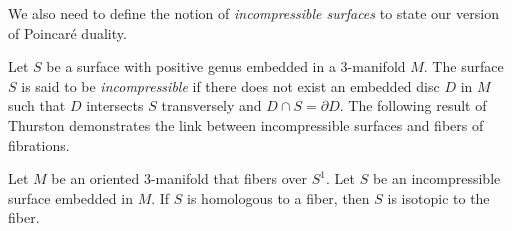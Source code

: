 


We also need to define the notion of \emph{incompressible surfaces} to state our version of Poincar\'e duality.

  Let $S$ be a surface with positive genus embedded in a $3$-manifold $M$.
  The surface $S$ is said to be \emph{incompressible} if there does not exist an embedded disc $D$ in $M$ such that $D$ intersects $S$ transversely and $D \cap S = \partial D$.
  The following result of Thurston demonstrates the link between incompressible surfaces and fibers of fibrations.

\begin{thm}
  \label{thm:Thur2}
Let $M$ be an oriented 3-manifold that fibers over $S^1$.  Let $S$ be an incompressible surface embedded in $M$.  If $S$ is homologous to a fiber, then $S$ is isotopic to the fiber.
\end{thm}



